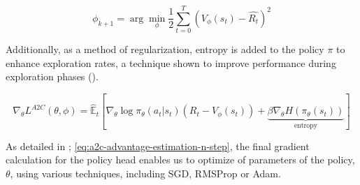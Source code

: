             \begin{equation}
                \phi_{k+1} = \arg \min_{\phi} \frac{1}{2} \sum_{t=0}^{T} \left( V_\phi(s_t) - \hat{R_t} \right)^2
                \label{eq:a2c-value-optimization}
            \end{equation}
            
            
            \noindent Additionally, as a method of regularization, entropy is added to the policy $\pi$ to enhance exploration rates, a technique shown to improve performance during exploration phases (\textcolor{deepblue}{\cite{penge}}). 
            
            \begin{equation}
                \nabla_{\theta} L^{A2C}(\theta, \phi) = \hat{\mathbb{E}}_{t} \left [ \nabla_{\theta}\log \pi_{\theta}(a_t | s_t) (R_t - V_{\phi}(s_t)) + \underbrace{\beta \nabla_{\theta} H(\pi_{\theta}(s_t))}_{\text{entropy}} \right]
                \label{eq:a2c-gradient-calculation}
            \end{equation}
            
            \noindent As detailed in \textcolor{deepblue}{\cite{mnih2016asynchronous}; \autoref{eq:a2c-advantage-estimation-n-step}}, the final gradient calculation for the policy head enables us to optimize of parameters of the policy, $\theta$, using various techniques, including SGD, RMSProp or Adam.
            
